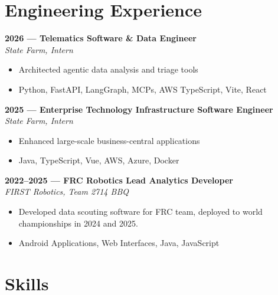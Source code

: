 \documentclass[11pt]{article}
\begin{document}
\vspace{0.4em}
\section*{Engineering Experience}

    \vspace{0.25em}
    \textbf{2026 --- Telematics Software \& Data Engineer} \\
    \textit{State Farm, Intern}
    \vspace{-0.5em}
    \begin{itemize}
        \item Architected agentic data analysis and triage tools
        \item Python, FastAPI, LangGraph, MCPs, AWS TypeScript, Vite, React
    \end{itemize}

    \vspace{0.25em}
    \textbf{2025 --- Enterprise Technology Infrastructure Software Engineer} \\
    \textit{State Farm, Intern}
    \vspace{-0.5em}
    \begin{itemize}
        \item Enhanced large-scale business-central applications
        \item Java, TypeScript, Vue, AWS, Azure, Docker
    \end{itemize}

    \vspace{0.25em}
    \textbf{2022--2025 --- FRC Robotics Lead Analytics Developer} \\
    \textit{FIRST Robotics, Team 2714 BBQ}
    \vspace{-0.5em}
    \begin{itemize}
        \item Developed data scouting software for FRC team, deployed to world championships in 2024 and 2025.
        \item Android Applications, Web Interfaces, Java, JavaScript
    \end{itemize}

\vspace{0.4em}
\section*{Skills}
\end{document}

